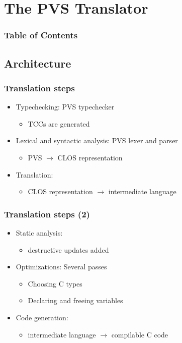 \documentclass{beamer}
\begin{document}
\section{The PVS Translator}
\begin{frame}
\frametitle{Table of Contents}
\tableofcontents[currentsection]
\end{frame}

\subsection{Architecture}

\begin{frame}
\frametitle{Translation steps}
\begin{itemize}
\itemsep2em
\item Typechecking: PVS typechecker
\begin{itemize}
\item TCCs are generated
\end{itemize}
\item Lexical and syntactic analysis: PVS lexer and parser
\begin{itemize}
\item PVS $\longrightarrow$ CLOS representation
\end{itemize}
\item Translation:
\begin{itemize}
\item CLOS representation $\longrightarrow$ intermediate language
\end{itemize}
\end{itemize}
\end{frame}

\begin{frame}
\frametitle{Translation steps (2)}
\begin{itemize}
\itemsep2em
\item Static analysis:
\begin{itemize}
\item destructive updates added
\end{itemize}
\item Optimizations: Several passes
\begin{itemize}
\item Choosing C types
\item Declaring and freeing variables
\end{itemize}
\item Code generation: 
\begin{itemize}
\item intermediate language $\longrightarrow$ compilable C code
\end{itemize}
\end{itemize}
\end{frame}
\end{document}
